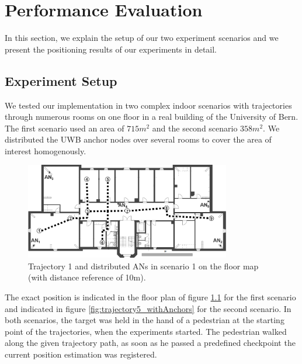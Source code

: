 
\chapter{Performance Evaluation} %

\label{Chapter6} %
In this section, we explain the setup of our two experiment scenarios and we present the positioning results of our experiments in detail.


\section{Experiment Setup}
We tested our implementation in two complex indoor scenarios with trajectories through numerous rooms on one floor in a real building of the University of Bern. The first scenario used an area of $715m^2$ and the second scenario $358m^2$. We distributed the UWB anchor nodes over several rooms to cover the area of interest homogenously.
\begin{figure}[th]
\centering
\includegraphics[width=0.8\textwidth]{Figures/trajectory1_withAnchors}
\decoRule
\caption[Anchor Node Positions of Scenario 1]{Trajectory 1 and distributed ANs in scenario 1 on the floor map (with distance reference of 10m).}
\label{fig:trajectory1_withAnchors}
\end{figure}The exact position is indicated in the floor plan of figure \ref{fig:trajectory1_withAnchors} for the first scenario and indicated in figure \ref{fig:trajectory5_withAnchors} for the second scenario. In both scenarios, the target was held in the hand of a pedestrian at the starting point of the trajectories, when the experiments started. The pedestrian walked along the given trajectory path, as soon as he passed a predefined checkpoint the current position estimation was registered.\\

